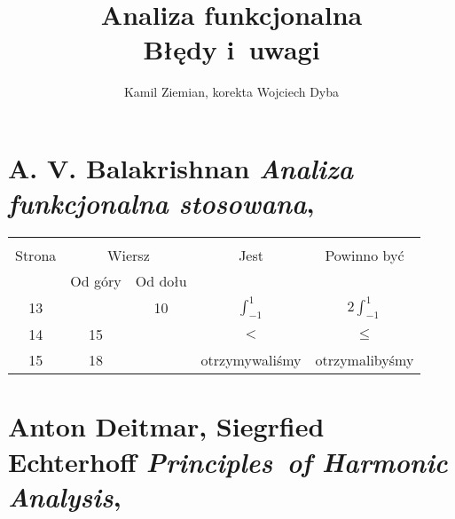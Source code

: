 \documentclass[a4paper,11pt]{article}
\title{Analiza funkcjonalna \\
  {\Large Błędy i~uwagi}}
\author{Kamil Ziemian, korekta Wojciech Dyba}
\numberwithin{equation}{section}
\begin{document}





\maketitle





\section{A. V. Balakrishnan
  \textit{Analiza funkcjonalna stosowana},
  \parencite{Balakrishnan-Analiza-funkcjonalna-stosowana-Pub-1992}}






\begin{center}

  \begin{tabular}{|c|c|c|c|c|}
    \hline
    & \multicolumn{2}{c|}{} & & \\
    Strona & \multicolumn{2}{c|}{Wiersz} & Jest
                              & Powinno być \\ \cline{2-3}
    & Od góry & Od dołu & & \\
    \hline
    13  & & 10 & $\int^{ 1 }_{ -1 }$ & $2 \int^{ 1 }_{ -1 }$ \\
    14  & 15 & & $<$ & $\leq$ \\
    15  & 18 & & otrzymywaliśmy & otrzymalibyśmy \\
    \hline
  \end{tabular}

\end{center}

\VerSpaceSix













\section{Anton Deitmar, Siegrfied Echterhoff
  \textit{Principles~of Harmonic Analysis},
  \parencite{Deitmar-Echterhoff-Principles-of-harmonic-analysis-Pub-2009}}
\end{document}
